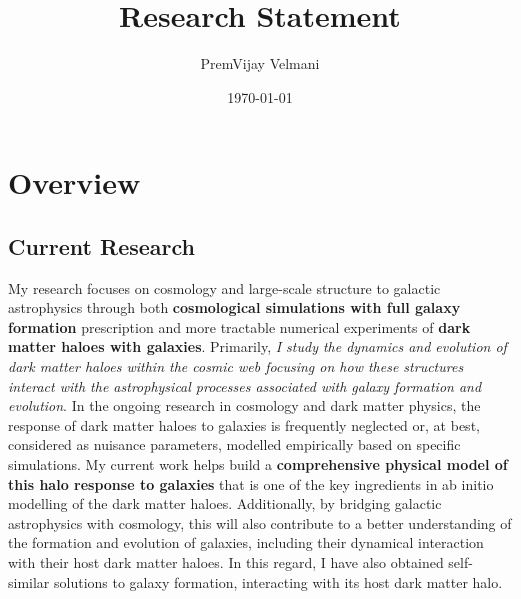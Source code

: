 \documentclass[11pt]{article}
\title{Research Statement}
\author{PremVijay Velmani}
\date{\today}
\begin{document}
\maketitle




\section{Overview}
\subsection{Current Research}
My research focuses on cosmology and large-scale structure to galactic astrophysics through both \textbf{cosmological simulations with full galaxy formation} prescription and more tractable numerical experiments of \textbf{dark matter haloes with galaxies}. Primarily, \textit{I study the dynamics and evolution of dark matter haloes within the cosmic web focusing on how these structures interact with the astrophysical processes associated with galaxy formation and evolution}. In the ongoing research in cosmology and dark matter physics, the response of dark matter haloes to galaxies is frequently neglected or, at best, considered as nuisance parameters, modelled empirically based on specific simulations. 
My current work helps build a \textbf{comprehensive physical model of this halo response to galaxies} that is one of the key ingredients in ab initio modelling of the dark matter haloes. Additionally, by bridging galactic astrophysics with cosmology, this will also contribute to a better understanding of the formation and evolution of galaxies, including their dynamical interaction with their host dark matter haloes. In this regard, I have also obtained self-similar solutions to galaxy formation, interacting with its host dark matter halo.
\end{document}

